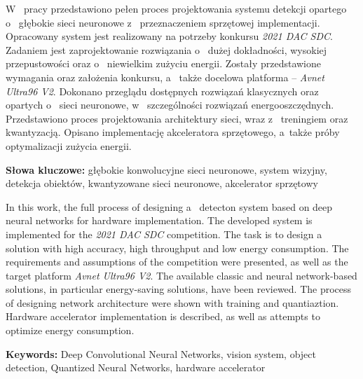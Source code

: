 \documentclass[12pt]{aghdpl}
\author{Michał Machura}
\date{2021}
\newenvironment{abstractpage}
{\cleardoublepage\vspace*{\fill}\thispagestyle{empty}}
{\vfill\cleardoublepage}
\renewenvironment{abstract}[1]
{\bigskip\selectlanguage{#1}%
    \begin{center}\bfseries\abstractname\end{center}}
{\par\bigskip}
\begin{document}
	\titlepages
	
	\begin{abstractpage}
    \begin{abstract}{polish}
        W~ pracy przedstawiono pełen proces projektowania systemu detekcji opartego o~ głębokie sieci neuronowe z~ przeznaczeniem sprzętowej implementacji.
        Opracowany system jest realizowany na potrzeby konkursu \emph{2021 DAC SDC}.
        Zadaniem jest zaprojektowanie rozwiązania o~ dużej dokładności, wysokiej przepustowości oraz o~ niewielkim zużyciu energii. 
        Zostały przedstawione wymagania oraz założenia konkursu, a~ także  docelowa platforma -- \emph{Avnet Ultra96 V2}. 
        Dokonano przeglądu dostępnych rozwiązań klasycznych oraz opartych o~ sieci neuronowe, w~ szczególności rozwiązań energooszczędnych. 
        Przedstawiono proces projektowania architektury sieci, wraz z~ treningiem oraz kwantyzacją. 
        Opisano implementację akceleratora sprzętowego, a~także próby optymalizacji zużycia energii. 
        
        \bigskip
        \textbf{Słowa kluczowe:}   głębokie konwolucyjne sieci neuronowe, system wizyjny, detekcja obiektów, kwantyzowane sieci neuronowe, akcelerator sprzętowy
       
       
    \end{abstract}
    \bigskip
    \bigskip
    \bigskip
    \bigskip
    \bigskip
    \bigskip
    \bigskip
    \bigskip
    \bigskip
    \bigskip
    \bigskip
    \begin{abstract}{english}
        In this work, the full process of designing a~ detecton system based on deep neural networks for hardware implementation.
        The developed system is implemented for the \emph{2021 DAC SDC} competition.
        The task is to design a~ solution with high accuracy, high throughput and low energy consumption.
        The requirements and assumptions of the competition were presented, as well as the target platform \emph{Avnet Ultra96 V2}.
        The available classic and neural network-based solutions, in particular energy-saving solutions, have been reviewed.
        The process of designing network architecture were shown with training and quantiaztion.
        Hardware accelerator implementation is described, as well as attempts to optimize energy consumption.  
        \bigskip
       
        \textbf{Keywords:} Deep Convolutional Neural Networks, vision system, object detection, Quantized Neural Networks, hardware accelerator
    \end{abstract}
\end{abstractpage}


	\RedefinePlainStyle
	
	\setcounter{tocdepth}{2}
	\tableofcontents
	\clearpage
	
	\newcommand{\round}[1]{\ensuremath{\lfloor#1\rceil}}
	
	
	
	
	
	
	
	

	
	\printbibliography
\end{document}
